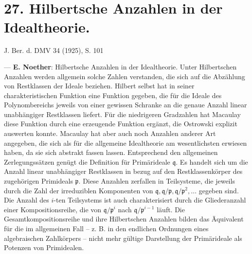 \documentclass[11pt]{article}
\newcommand{\mq}{\mathfrak q}
\newcommand{\mpideal}{\mathfrak p}
\begin{document}
\section*{27. Hilbertsche Anzahlen in der Idealtheorie.}

\begin{center}
J. Ber. d. DMV 34 (1925), S. 101
\end{center}

--- \textbf{E. Noether}: Hilbertsche Anzahlen in der Idealtheorie. Unter Hilbertschen Anzahlen werden allgemein solche Zahlen verstanden, die sich auf die Abzählung von Restklassen der Ideale beziehen. Hilbert selbst hat in seiner \glqq{}charakteristischen Funktion\grqq{} eine Funktion gegeben, die für die Ideale des Polynombereichs jeweils von einer gewissen Schranke an die genaue Anzahl linear unabhängiger Restklassen liefert. Für die niedrigeren Gradzahlen hat Macaulay diese Funktion durch eine erzeugende Funktion ergänzt, die Ostrowski explizit auswerten konnte. Macaulay hat aber auch noch Anzahlen anderer Art angegeben, die sich als für die allgemeine Idealtheorie am wesentlichsten erwiesen haben, da sie sich abstrakt fassen lassen. Entsprechend den allgemeinen Zerlegungssätzen genügt die Definition für Primärideale $\mq$. Es handelt sich um die Anzahl linear unabhängiger Restklassen in bezug auf den Restklassenkörper des zugehörigen Primideals $\mpideal$. Diese Anzahlen zerfallen in Teilsysteme, die jeweils durch die Zahl der irreduziblen Komponenten von $\mq,\mq/\mpideal,\mq/\mpideal^2,\ldots$ gegeben sind. Die Anzahl des $i$-ten Teilsystems ist auch charakterisiert durch die Gliederanzahl einer Kompositionsreihe, die von $\mq/\mpideal^i$ nach $\mq/\mpideal^{i-1}$ läuft. Die Gesamtkompositionsreihe und ihre Hilbertschen Anzahlen bilden das Äquivalent für die im allgemeinen Fall -- z. B. in den endlichen Ordnungen eines algebraischen Zahlkörpers -- nicht mehr gültige Darstellung der Primärideale als Potenzen von Primidealen.
\end{document}
